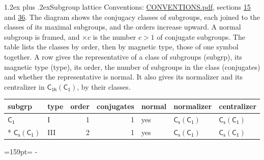 \documentclass[10pt,a4paper]{article}
\makeatletter
\renewcommand\section{\@startsection{section}{1}{\z@}{-3ex plus -1ex minus -.2ex}%
  {1.2ex plus .2ex}{\normalfont\large\sffamily\bfseries\color{parttitle}}}
\newcommand{\needspace}[1]{\par\penalty-100\begingroup\dimen0=#1\relax\dimen2=\pagegoal
  \advance\dimen2-\pagetotal\ifdim\dimen0>\dimen2\relax\ifdim\dimen2>0pt\vfil\break\fi\fi
  \endgroup}
\numberwithin{equation}{section}
\newcommand{\grp}[1]{\mathsf{#1}}
\makeatother
\begin{document}
\section{Subgroup lattice}\label{s:subgroups}
Conventions: \href{../../CONVENTIONS.pdf}{CONVENTIONS.pdf}, sections \href{../../../rotation/CONVENTIONS.pdf\#conv.15}{15} and \href{../../CONVENTIONS.pdf\#conv.36}{36}.
The diagram shows the conjugacy classes of subgroups, each joined to the classes of its maximal subgroups, and the orders increase upward. \label{n:index.conjugates.c}A normal subgroup is framed, and ${\times}c$ is the number $c > 1$ of conjugate subgroups. The table lists the classes by order, then by magnetic type, those of one symbol together. \label{n:head.subgroup}\label{n:head.magnetic.type}\label{n:head.order}\label{n:head.conjugates}\label{n:head.normal}A row gives the representative of a class of subgroups (subgrp), its magnetic type (type), its order, the number of subgroups in the class (conjugates) and whether the representative is normal. \label{n:head.normalizer}\label{n:head.centralizer}It also gives its normalizer and its centralizer in $\grp{C_{1h}}(\grp{C_{1}})$, by their classes. 
\begin{center}
\end{center}
{\small\begin{longtable}{@{}llrrlll@{}}\toprule
subgrp & type & order & conjugates & normal & normalizer & centralizer\\\midrule\endhead
\bottomrule\endfoot\endlastfoot
\href{../../../rotation/data/pdf/C1.pdf}{$\grp{C_{1}}$} & I & 1 & 1 & yes & \href{C1v-C1.pdf}{$\grp{C_{s}}(\grp{C_{1}})$} & \href{C1v-C1.pdf}{$\grp{C_{s}}(\grp{C_{1}})$}\\*
\href{C1v-C1.pdf}{$\grp{C_{s}}(\grp{C_{1}})$} & III & 2 & 1 & yes & \href{C1v-C1.pdf}{$\grp{C_{s}}(\grp{C_{1}})$} & \href{C1v-C1.pdf}{$\grp{C_{s}}(\grp{C_{1}})$}\\
\bottomrule\end{longtable}}
\needspace{159pt}
\end{document}
